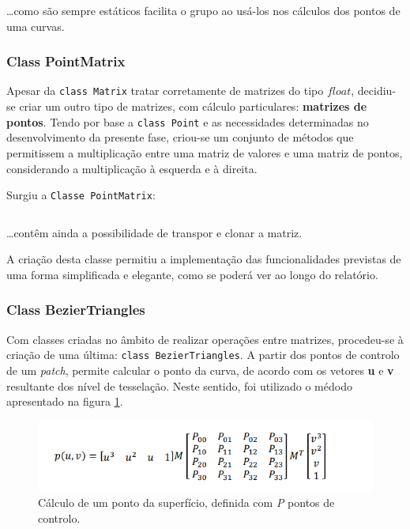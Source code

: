\documentclass[relatorio.tex]{subfiles}
\begin{document}
\begin{code}
    \label{code:defmat}
    \inputminted[firstline=7, lastline=12]{cpp}{../../cartesian/matrix.h}
\end{code}
\dots como são sempre estáticos facilita o grupo ao usá-los nos cálculos dos pontos de uma curvas.

\subsubsection{Class PointMatrix}
Apesar da \texttt{class Matrix} tratar corretamente de matrizes do tipo $float$,
decidiu-se criar um outro tipo de matrizes, com cálculo particulares:
\textbf{matrizes de pontos}. 
Tendo por base a \texttt{class Point} e as necessidades determinadas no desenvolvimento
da presente fase,
criou-se um conjunto de métodos que permitissem a multiplicação entre
uma matriz de valores e uma matriz de pontos, considerando a multiplicação à esquerda e à direita.

Surgiu a \texttt{Classe PointMatrix}:
\begin{code}
    \label{code:point_matrix.h}
    \inputminted[firstline=6, lastline=10]{cpp}{../../cartesian/PointMatrix.h}
\end{code}
\dots contêm ainda a possibilidade de transpor e clonar a matriz.

A criação desta classe permitiu a implementação das funcionalidades previstas de uma forma
simplificada e elegante, como se poderá ver ao longo do relatório.

\subsubsection{Class BezierTriangles}
Com classes criadas no âmbito de realizar operações entre matrizes,
procedeu-se à criação de uma última: \texttt{class BezierTriangles}.
A partir dos pontos de controlo de um \textit{patch}, permite calcular o ponto da curva,
de acordo com os vetores \textbf{u} e \textbf{v} resultante dos nível de tesselação.
Neste sentido, foi utilizado o médodo apresentado na figura \ref{fig:bezier_point}.
\begin{figure}
    \centering
    \includegraphics[width=\linewidth]{assets/bezier_patches_point.png}
    \caption{Cálculo de um ponto da superfício, definida com \textit{P} pontos de controlo.}
    \label{fig:bezier_point}
\end{figure}
\end{document}
